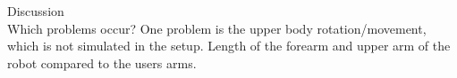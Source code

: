Discussion\\
 Which problems occur?
One problem is the upper body rotation/movement, which is not simulated in the setup.
Length of the forearm and upper arm of the robot compared to the users arms.
